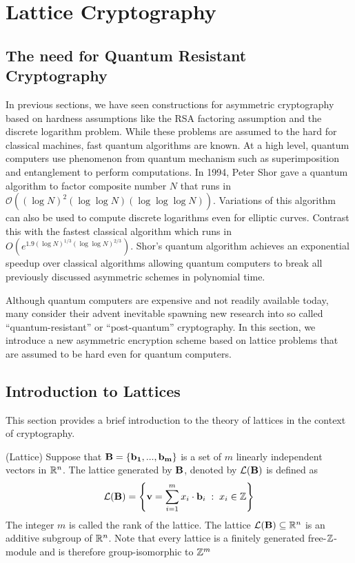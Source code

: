 \section{Lattice Cryptography}


\subsection{The need for Quantum Resistant Cryptography}
In previous sections, we have seen constructions for asymmetric cryptography based on hardness assumptions like the RSA factoring assumption and the discrete logarithm problem. While these problems are assumed to the hard for classical machines, fast quantum algorithms are known. At a high level, quantum computers use phenomenon from quantum mechanism such as superimposition and entanglement to perform computations. 
In 1994, Peter Shor gave a quantum algorithm \cite{Shor1994} to factor composite number $N$ that runs in $\mathcal{O}\left( (\log N)^2(\log \log N) (\log \log \log N)\right)$. Variations of this algorithm can also be used to compute discrete logarithms even for elliptic curves. Contrast this with the fastest classical algorithm which runs in $O(e^{1.9 (\log N)^{1/3} (\log \log N)^{2/3}})$. Shor's quantum algorithm achieves an exponential speedup over classical algorithms allowing quantum computers to break all previously discussed asymmetric schemes in polynomial time. 

Although quantum computers are expensive and not readily available today, many consider their advent inevitable spawning new research into so called ``quantum-resistant'' or ``post-quantum'' cryptography. In this section, we introduce a new asymmetric encryption scheme based on lattice problems that are assumed to be hard even for quantum computers.  

\subsection{Introduction to Lattices}
This section provides a brief introduction to the theory of lattices in the context of cryptography.
\begin{definition}
(Lattice)
Suppose that $\mathbf{B} = \{\mathbf{b_1},...,\mathbf{b_m}\}$ is a set of $m$ linearly independent vectors in $\mathbb{R}^n$. The lattice generated by $\mathbf{B}$, denoted by $\mathcal{L}(\mathbf{B})$ is defined as
\[
\mathcal{L}(\mathbf{B}) = \left\{ \mathbf{v} = \sum_{i=1}^m x_i \cdot \mathbf{b}_i \; : \; x_i \in {{\mathbb Z}} \right\}
\]
The integer $m$ is called the rank of the lattice. The lattice $\mathcal{L}(\mathbf{B}) \subseteq \mathbb{R}^n$ is an additive subgroup of $\mathbb{R}^n$. Note that every lattice is a finitely generated free-${{\mathbb Z}}$-module and is therefore group-isomorphic to ${{\mathbb Z}}^m$ 
\end{definition}

